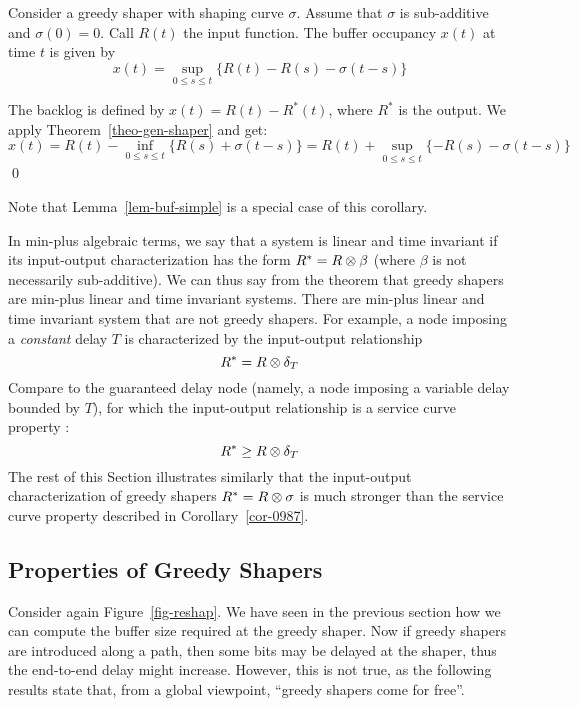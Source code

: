 \begin{corollary}
Consider a greedy shaper with shaping curve $\sigma$. Assume that
$\sigma$ is sub-additive and $\sigma(0)=0$. Call $R(t)$ the input
function. The buffer occupancy $x(t)$ at time $t$ is given by $$
x(t) = \sup_{0 \leq s \leq t} \{ R(t) - R(s) - \sigma(t-s) \} $$
\end{corollary}
\pr The backlog is defined by $x(t)=R(t)-R^*(t)$, where $R^*$ is
the output. We apply Theorem~\ref{theo-gen-shaper} and get:
 $$
 x(t)=R(t)-\inf_{0 \leq s \leq t}\{ R(s)+\sigma(t-s)\}
 =R(t)+\sup_{0 \leq s \leq t}\{- R(s)-\sigma(t-s)\}
 $$
 \qed

Note that Lemma~\ref{lem-buf-simple} is a special case of this
corollary.

In min-plus algebraic terms, we say that a system is linear and
time invariant if its input-output characterization has the form
$R^{*}=R\otimes \beta$ (where $\beta$ is not necessarily
sub-additive).  We can thus say from the theorem that greedy
shapers are min-plus linear and time invariant systems. There are
min-plus linear and time invariant system that are not greedy
shapers. For example, a node imposing a \emph{constant} delay $T$
is characterized by the input-output relationship
 $$R^* = R \otimes \delta_T
 $$
Compare to the guaranteed delay node (namely, a node imposing a
variable delay bounded by $T$), for which the input-output
relationship is a service curve property :
 $$R^* \geq R \otimes \delta_T$$
The rest of this Section illustrates similarly that the
input-output characterization of greedy shapers $R^* = R \otimes
\sigma$ is much stronger than the service curve property described
in Corollary~\ref{cor-0987}.

\subsection{Properties of Greedy Shapers}
Consider again Figure~\ref{fig-reshap}. We have seen in the
previous section how we can compute the buffer size required at
the greedy shaper. Now if greedy shapers are introduced along a
path, then some bits may be delayed at the shaper, thus the
end-to-end delay might increase. However, this is not true, as the
following results state that, from a global viewpoint, ``greedy
shapers come for free''.

